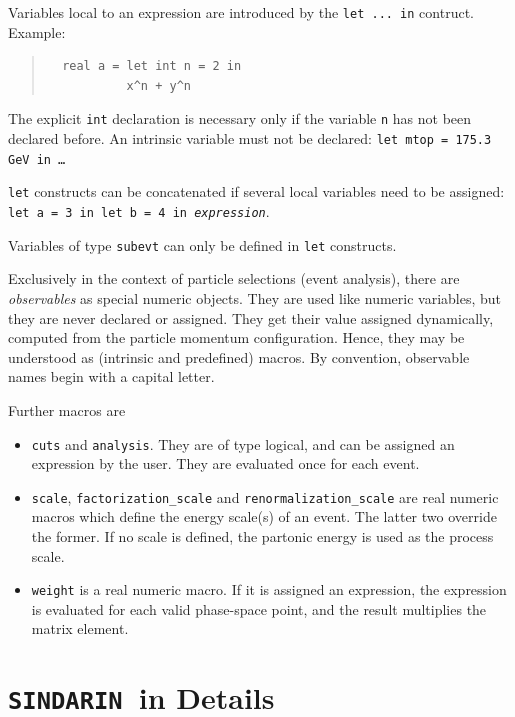\documentclass[12pt]{book}
\newcommand{\ttt}[1]{\texttt{#1}}
\newcommand{\sindarin}{\ttt{SINDARIN}}
\begin{document}
Variables local to an expression are introduced by the \ttt{let ... in}
contruct.  Example:
\begin{quote}
\begin{footnotesize}
\begin{verbatim}
  real a = let int n = 2 in
           x^n + y^n
\end{verbatim}
\end{footnotesize}
\end{quote}
The explicit \ttt{int} declaration is necessary only if the variable \ttt{n}
has not been declared before.  An intrinsic variable must not be declared:
\ttt{let mtop = 175.3 GeV in \ldots}

\ttt{let} constructs can be concatenated if several local variables need to
be assigned: \ttt{let a = 3 in let b = 4 in \textit{expression}}.

Variables of type \ttt{subevt} can only be defined in \ttt{let} constructs.

Exclusively in the context of particle selections (event analysis), there are
\emph{observables} as special numeric objects.  They are used like numeric
variables, but they are never declared or assigned.  They get their value
assigned dynamically, computed from the particle momentum configuration.
Hence, they may be understood as (intrinsic and predefined) macros.
By convention, observable names begin with a capital letter.

Further macros are
\begin{itemize}
\item
  \ttt{cuts} and \ttt{analysis}.  They are of type logical, and can be
  assigned an expression by the user.  They are evaluated once for
  each event.
\item
  \ttt{scale}, \ttt{factorization\_scale} and
  \ttt{renormalization\_scale} are real numeric macros which define the
  energy scale(s) of an event.  The latter two override the former.
  If no scale is defined, the partonic energy is used as the process scale.
\item
  \ttt{weight} is a real numeric macro.  If it is assigned an
  expression, the expression is evaluated for each valid phase-space
  point, and the result multiplies the matrix element.
\end{itemize}


\chapter{\sindarin\ in Details}
\label{chap:sindarin}
\end{document}

